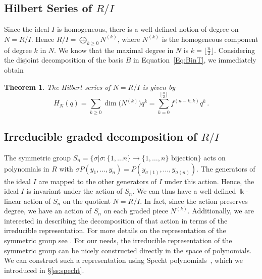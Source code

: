 \documentclass[10pt,a4paper]{article}
\newtheorem{theorem}{Theorem}[section]
\def\field{\Bbbk}
\begin{document}
\subsection{Hilbert  Series of $R/I$}\label{ss:hilbert}
Since the ideal $I$ is homogeneous, there is a well-defined notion of degree on $N=R/I$. Hence $R/I=\bigoplus_{k\ge 0} N^{(k)}$, 
where $N^{(k)}$ is the homogeneous component of degree $k$ in $N$. We know that the maximal degree in $N$ is $k= \lfloor \frac{n}{2} \rfloor$.
Considering the disjoint decomposition of the basis $B$ in  Equation~\eqref{Eq:BinT}, we immediately obtain
\begin{theorem}\label{thm:hlbert}
 The Hilbert series of $N=R/I$ is given by
 $$ H_N(q) = \sum_{k\ge 0} \dim\big( N^{(k)}\big) q^k = \sum_{k=0}^{ \lfloor \frac{n}{2} \rfloor} f^{(n-k,k)} q^k\,.
 $$
\end{theorem}


\subsection{Irreducible graded decomposition of $R/I$}\label{ss:irreducible}
The symmetric group $S_n=\big\{ \sigma \big| \sigma\colon \{1,\ldots n\}\to\{1,\ldots,n\}\text{ bijection}\big\}$ acts on polynomials in $R$ with 
$\sigma P(y_1,\ldots,y_n)=P(y_{\sigma(1)},\ldots,y_{\sigma(n)})$. The generators of the ideal $I$ are mapped to the other generators of $I$ under this action. Hence, the ideal $I$ is invariant under the action of $S_n$. We can thus have a well-defined $\field$-linear action of $S_n$ on the quotient $N=R/I$. In fact, since the  action preserves degree, we have an action of $S_n$ on each graded piece $N^{(k)}$. Additionally, we are interested in describing the decomposition of that action in terms of the irreducible representation. For more details on the representation of the symmetric group see  \cite{Sagan}. For our needs, the irreducible representation of the symmetric group can be nicely constructed directly in the space of polynomials. We can construct such a representation using Specht polynomials~\cite{Specht}, which we introduced in \S\ref{ss:specht}.
\end{document}
